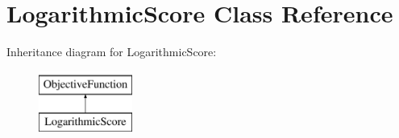 \hypertarget{classLogarithmicScore}{\section{Logarithmic\-Score Class Reference}
\label{classLogarithmicScore}
}
Inheritance diagram for Logarithmic\-Score\-:\begin{figure}[H]
\begin{center}
\leavevmode
\includegraphics[height=2.000000cm]{classLogarithmicScore}
\end{center}
\end{figure}

